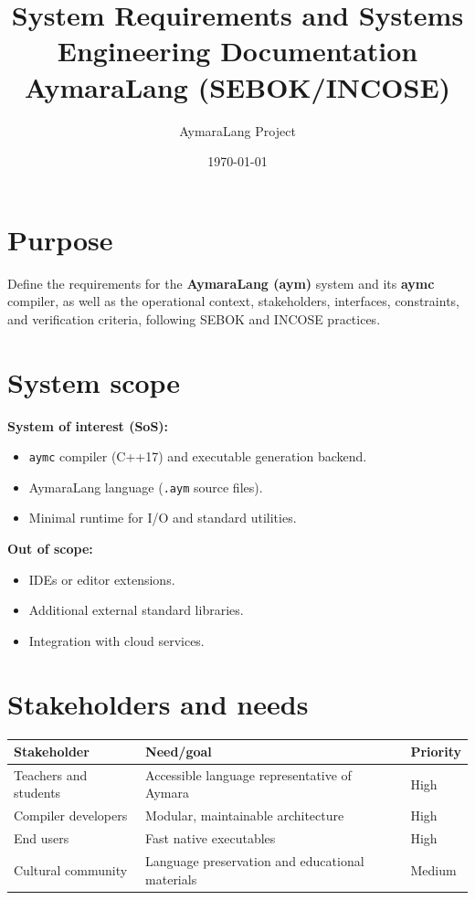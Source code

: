 \documentclass[11pt,a4paper]{article}
\title{System Requirements and Systems Engineering Documentation\\AymaraLang (SEBOK/INCOSE)}
\author{AymaraLang Project}
\date{\today}
\begin{document}
\maketitle

\section{Purpose}
Define the requirements for the \textbf{AymaraLang (aym)} system and its \textbf{aymc} compiler, as well as the operational context, stakeholders, interfaces, constraints, and verification criteria, following SEBOK and INCOSE practices.

\section{System scope}
\textbf{System of interest (SoS):}
\begin{itemize}
    \item \texttt{aymc} compiler (C++17) and executable generation backend.
    \item AymaraLang language (\texttt{.aym} source files).
    \item Minimal runtime for I/O and standard utilities.
\end{itemize}

\textbf{Out of scope:}
\begin{itemize}
    \item IDEs or editor extensions.
    \item Additional external standard libraries.
    \item Integration with cloud services.
\end{itemize}

\section{Stakeholders and needs}
\begin{longtable}{@{}p{4cm}p{8cm}p{2cm}@{}}
\toprule
\textbf{Stakeholder} & \textbf{Need/goal} & \textbf{Priority} \\ \midrule
Teachers and students & Accessible language representative of Aymara & High \\
Compiler developers & Modular, maintainable architecture & High \\
End users & Fast native executables & High \\
Cultural community & Language preservation and educational materials & Medium \\ \bottomrule
\end{longtable}
\end{document}

